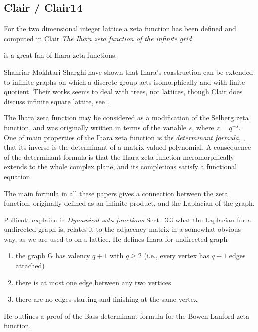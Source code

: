 \subsection{Clair / Clair14}
\label{sect:Clair14}

For the two dimensional integer lattice a zeta function has been defined
and computed in
Clair
{\em The {Ihara} zeta function of the infinite grid}

 is a great fan of
{Ihara zeta functions}.

Shahriar Mokhtari-Sharghi have shown that Ihara's
construction can be extended to infinite graphs on which a discrete group
acts isomorphically and with finite quotient. Their works seems to deal with
trees, not lattices, though Clair does discuss infinite square
lattice, see .

The Ihara zeta function may be considered as a modification of the Selberg
zeta function, and was originally written in terms of the variable
$s$, where $z= q^{-s}$.
One of main properties of the Ihara zeta function is the \emph{determinant
formula}, \ie, that its inverse is the determinant of a matrix-valued
polynomial.
A consequence of the determinant formula is that the Ihara zeta function
meromorphically extends to the whole complex plane, and its completions
satisfy a functional equation.

The main formula in all these papers gives a connection between the zeta
function, originally defined as an infinite product, and the Laplacian of the
graph.

Pollicott explains in {\em Dynamical zeta functions} Sect.~3.3
what the Laplacian for a undirected graph is, relates it to the adjacency matrix
in a somewhat obvious way, as we are used to on a lattice. He defines Ihara
for undirected graph
\begin{enumerate}
  \item
the graph G has valency $q + 1$ with $q \geq 2$ (i.e., every vertex has $q +
1$ edges attached)
  \item
there is at most one edge between any two vertices
  \item
there are no edges starting and finishing at the same vertex
\end{enumerate}
He outlines a  proof  of  the Bass determinant formula for
the Bowen-Lanford zeta function.

